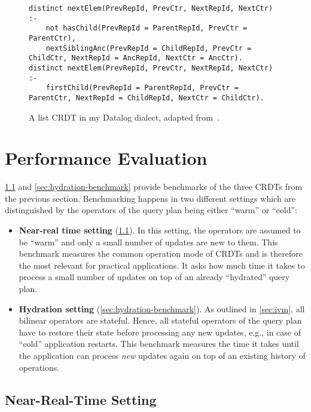 \begin{figure}[htpb]
\begin{lstlisting}[keepspaces]
distinct nextElem(PrevRepId, PrevCtr, NextRepId, NextCtr) :-
    not hasChild(PrevRepId = ParentRepId, PrevCtr = ParentCtr),
    nextSiblingAnc(PrevRepId = ChildRepId, PrevCtr = ChildCtr, NextRepId = AncRepId, NextCtr = AncCtr).
distinct nextElem(PrevRepId, PrevCtr, NextRepId, NextCtr) :-
    firstChild(PrevRepId = ParentRepId, PrevCtr = ParentCtr, NextRepId = ChildRepId, NextCtr = ChildCtr).\end{lstlisting}
	\caption{A list \ac{CRDT} in my Datalog dialect, adapted from~\cite{kleppmann2018data}.}\label{code:list-crdt-datalog-dialect}
\end{figure}

\section{Performance Evaluation}\label{sec:benchmarks}

\ref{sec:near-real-time-benchmark} and \ref{sec:hydration-benchmark}
provide benchmarks of the three \acp{CRDT} from the previous section.
Benchmarking happens in two different settings which are distinguished by
the operators of the query plan being either ``warm'' or ``cold'':

\begin{itemize}
	\item \textbf{Near-real time setting} (\ref{sec:near-real-time-benchmark}).
	      In this setting, the operators are assumed to be ``warm'' and only
	      a small number of updates are new to them.
	      This benchmark measures the common operation mode of \acp{CRDT} and
	      is therefore the most relevant for practical applications. It asks
	      how much time it takes to process a small number of updates on top of
	      an already ``hydrated'' query plan.
	\item \textbf{Hydration setting} (\ref{sec:hydration-benchmark}).
	      As outlined in \ref{sec:ivm}, all bilinear operators are stateful.
	      Hence, all stateful operators of the query plan have to restore
	      their state before processing any new updates, e.g., in case of ``cold''
	      application restarts. This benchmark measures the time it takes
	      until the application can process \emph{new} updates again on top of
	      an existing history of operations.
\end{itemize}

\subsection{Near-Real-Time Setting}\label{sec:near-real-time-benchmark}

